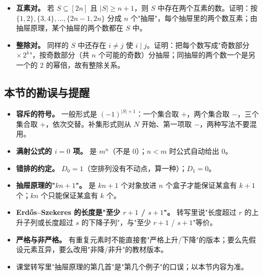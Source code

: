 \begin{itemize}
\item \textbf{互素对。} 若 $S\subseteq[2n]$ 且 $|S|\ge n+1$，则 $S$ 中存在两个互素的数。证明：按 $\{1,2\},\{3,4\},\dots,\{2n-1,2n\}$ 分成 $n$ 个"抽屉"，每个抽屉里的两个数互素；由抽屉原理，某个抽屉的两个数都在 $S$ 中。
\item \textbf{整除对。} 同样的 $S$ 中还存在 $i\ne j$ 使 $i\mid j$。证明：把每个数写成"奇数部分 $\times\,2^k$"，按奇数部分（共 $n$ 个可能的奇数）分抽屉；同抽屉的两个数一个是另一个的 $2$ 的幂倍，故有整除关系。
\end{itemize}


\subsection{本节的勘误与提醒}


\begin{itemize}
\item \textbf{容斥的符号。} 一般形式是 $(-1)^{|S|+1}$：一个集合取 $+$，两个集合取 $-$，三个集合取 $+$，依次交替。补集形式则从 $N$ 开始、第一项取 $-$，两种写法不要混用。
\item \textbf{满射公式的 $i=0$ 项。} 是 $m^n$（不是 $0$）；$n<m$ 时公式自动给出 $0$。
\item \textbf{错排的约定。} $D_0=1$（空排列没有不动点，算一种）；$D_1=0$。
\item \textbf{抽屉原理的"$kn+1$"。} 是 $kn+1$ 个对象放进 $n$ 个盒子才能保证某盒有 $k+1$ 个；$kn$ 个只能保证某盒有 $k$ 个。
\item \textbf{Erdős–Szekeres 的长度是"至少 $r+1$ / $s+1$"。} 转写里说"长度超过 $r$ 的上升子列或长度超过 $s$ 的下降子列"，与"至少 $r+1$ / $s+1$"等价。
\item \textbf{严格与非严格。} 有重复元素时不能直接套"严格上升/下降"的版本；要么先假设元素互异，要么改用"非降/非升"的教材版本。
\item 课堂转写里"抽屉原理的第几首"是"第几个例子"的口误；以本节内容为准。
\end{itemize}
